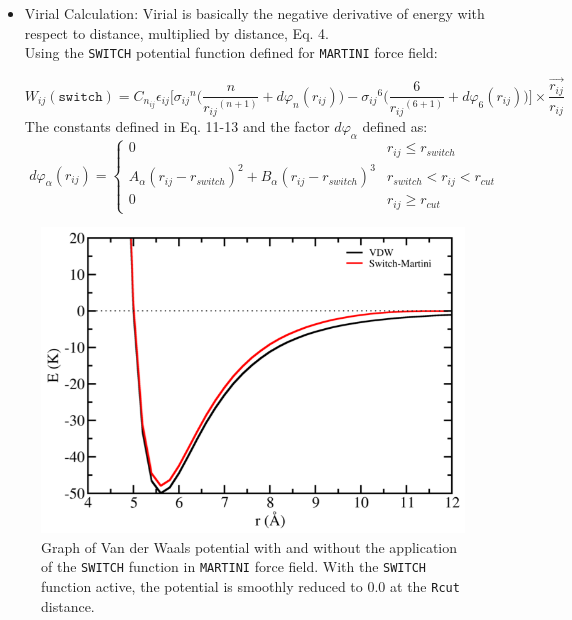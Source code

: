 \begin{itemize}
\item Virial Calculation: Virial is basically the negative derivative of energy with respect to distance, multiplied by distance, Eq. 4.\\
Using the \texttt{SWITCH} potential function defined for \texttt{MARTINI} force field:

	\begin{equation}
	W_{ij}(\texttt{switch}) = C_{n_{ij}}\epsilon_{ij} \Bigg[ {\sigma_{ij}}^{n} \bigg(\frac{n}{{r_{ij}}^{(n+1)}} + d\varphi_{n} (r_{ij}) \bigg) - {\sigma_{ij}}^{6} \bigg(\frac{6}{{r_{ij}}^{(6+1)}} +d \varphi_{6} (r_{ij}) \bigg) \Bigg]\times \frac{\overrightarrow{r_{ij}}}{r_{ij}}
	\end{equation}
The constants defined in Eq. 11-13 and the factor $d\varphi_{\alpha}$ defined as:
\[
	d\varphi_{\alpha}(r_{ij}) = 
	\begin{cases}
		0 & r_{ij} \leq r_{switch} \\
		A_{\alpha} (r_{ij} - r_{switch})^2 + B_{\alpha} (r_{ij} - r_{switch})^3 & r_{switch} < r_{ij} < r_{cut} \\
		0 & r_{ij} \geq r_{cut}
	\end{cases}
\]
\begin{equation}
\end{equation}
\end{itemize}

\begin{figure}[H]
\centering
\includegraphics[scale=1.0]{images/MARTINI}
\caption{Graph of Van der Waals potential with and without the application of the \texttt{SWITCH} function in \texttt{MARTINI} force field. With the \texttt{SWITCH} function active, the potential is smoothly reduced to 0.0 at the \texttt{Rcut} distance.  }
\end{figure}	
\newpage

